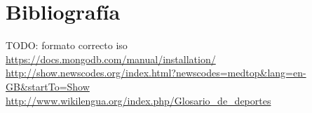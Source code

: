 \documentclass[../all.tex]{subfiles}
\begin{document}
\section{Bibliografía} 

{\color{red} TODO: formato correcto iso}\\
\url{https://docs.mongodb.com/manual/installation/}
\\
\url{http://show.newscodes.org/index.html?newscodes=medtop&lang=en-GB&startTo=Show}
\\
\url{http://www.wikilengua.org/index.php/Glosario_de_deportes}
\end{document}
